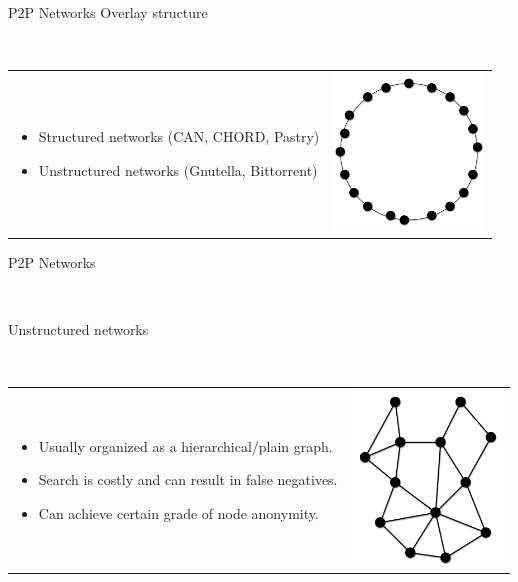 \documentclass[12pt]{beamer}
\renewcommand{\frametitle}[1]{\vspace{0.2cm}\begin{huge}#1\end{huge}\\}
\renewcommand{\framesubtitle}[1]{\vspace{0.4cm} \hspace{0.4cm}\begin{large}#1\end{large}\\}
\begin{document}
    \begin{frame}
    \frametitle{P2P Networks Overlay structure}
    \begin{table}
    \begin{tabular}{p{7cm}p{3cm}}
    \begin{itemize}
        \item Structured networks (CAN, CHORD, Pastry)
        \item Unstructured networks (Gnutella, Bittorrent)
    \end{itemize}
    &
    \vspace{1.5cm}
    \includegraphics[width=4cm]{../../presentacion/img/p2p-structured}\\
    \end{tabular}
    \end{table}
    \end{frame}

    \begin{frame}
    \frametitle{P2P Networks}
    \framesubtitle{Unstructured networks}
    \begin{table}
    \begin{tabular}{p{7cm}p{3cm}}
    \begin{itemize}
        \item Usually organized as a hierarchical/plain graph.
        \item Search is costly and can result in false negatives.
        \item Can achieve certain grade of node anonymity. 
    \end{itemize}
    &
    \vspace{1.5cm}
    \includegraphics[width=4cm]{../../presentacion/img/p2p-unstructured}\\
    \end{tabular}
    \end{table}
    \end{frame}
\end{document}
